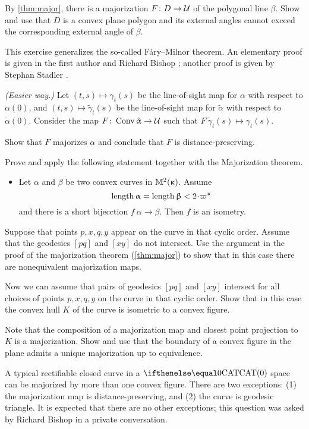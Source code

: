  By \ref{thm:major}, there is a majorization $F\:D\to\spc{U}$ of the polygonal line $\beta$.
Show and use that $D$ is a convex plane polygon and its external angles cannot exceed the corresponding external angle of $\beta$.


 This exercise generalizes the so-called Fáry–Milnor theorem.
An elementary proof is given in the first author and Richard Bishop \cite{alexander-bishop:fm};
another proof is given by Stephan Stadler \cite{stadler}.

\textit{(Easier way.)} 
Let 
$(t,s)\mapsto \gamma_t(s)$ be the line-of-sight map 
for $\alpha$ with respect to $\alpha(0)$,
and 
$(t,s)\mapsto \tilde \gamma_t(s)$ be the line-of-sight map 
for $\tilde \alpha$ with respect to $\tilde \alpha(0)$.
Consider the map  $F\:\Conv\tilde \alpha\to \spc{U}$ such that 
$F\:\tilde \gamma_t(s)\mapsto \gamma_t(s)$.

Show that $F$ majorizes $\alpha$
and conclude that $F$ is distance-preserving.

Prove and apply the following statement together with the Majorization theorem.
\begin{itemize}
\item Let $\alpha$ and $\beta$ be two convex curves in $\mathbb{M}_{{}}^{2}({\upkappa})$.
Assume 
\[\length \alpha=\length\beta<2\cdot\varpi\kappa\]
and there is a short bijecction $f\:\alpha\to\beta$.
Then $f$ is an isometry.
\end{itemize}

Suppose that points $p,x,q,y$ appear on the curve in that cyclic order.
Assume that the geodesics $[pq]$ and $[xy]$ do not intersect.
Use the argument in the proof of the majorization theorem (\ref{thm:major}) to show that in this case there are nonequivalent majorization maps.

Now we can assume that pairs of geodesics $[pq]$ and $[xy]$ intersect for all choices of points $p,x,q,y$ on the curve in that cyclic order.
Show that in this case the convex hull $K$ of the curve is isometric to a convex figure.

Note that the composition of a majorization map and closest point projection to $K$ is a majorization.
Show and use that the boundary of a convex figure in the plane admits a unique majorization up to equivalence.

A typical rectifiable closed curve in a $\CAT0$ space can be majorized by more than one convex figure.
There are two exceptions: (1) the majorization map is distance-preserving, and (2) the curve is geodesic triangle.
It is expected that there are no other exceptions;
this question was asked by Richard Bishop in a private conversation.

